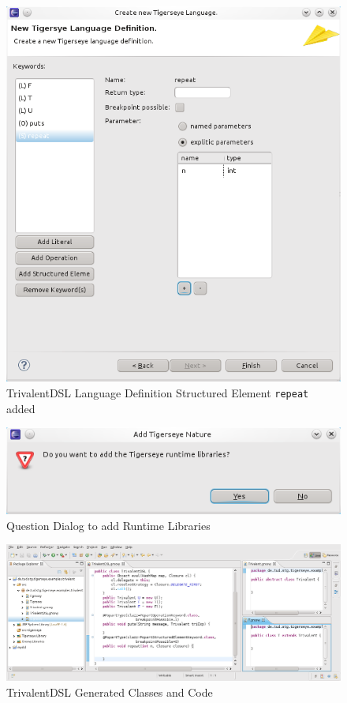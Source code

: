 	\begin{figure}
	  \centering
	  \includegraphics[width=.5\textwidth,keepaspectratio=true]{./pics/example_newlang_structuredelementadded.png}
	  \caption{TrivalentDSL Language Definition Structured Element \texttt{repeat} added}\label{fig:example_newlang_structuredelementadded}
	\end{figure}
	
	\begin{figure}
	  \centering
	  \includegraphics[width=.5\textwidth,keepaspectratio=true]{./pics/example_newlang_addruntime.png}
	  \caption{Question Dialog to add \tiger Runtime Libraries}\label{fig:example_newlang_addruntime}
	\end{figure}

	\begin{figure}
	  \centering
	  \includegraphics[width=\textwidth,keepaspectratio=true]{./pics/example_newlang_generatedcode.png}
	  \caption{TrivalentDSL Generated Classes and Code}\label{fig:example_newlang_generatedcode}
	\end{figure}

